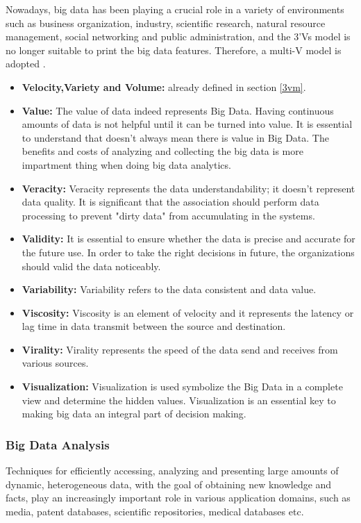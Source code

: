 Nowadays, big data has been playing a crucial role in a variety of environments such as business organization, industry, scientific research, natural resource management, social networking and public administration, and the 3'Vs model is no longer suitable to print the big data features. Therefore, a multi-V model is adopted \cite{cite18}.\\


\begin{itemize}
\item \textbf{Velocity,Variety and Volume:} already defined in section \ref{3vm}.  
\item \textbf{Value:} The value of data indeed represents Big Data. Having continuous amounts of data is not helpful until it can be turned into value. It is essential to understand that doesn't always mean there is value in Big Data. The benefits and costs of analyzing and collecting the big data is more impartment thing when doing big data analytics.
\item \textbf{Veracity:} Veracity represents the data understandability; it
doesn't represent data quality. It is significant that the association should perform data processing to prevent "dirty data" from accumulating in the systems. 
\item \textbf{Validity:} It
is essential to ensure whether the data is precise and accurate for the future use. In
order to take the right decisions in future, the organizations should valid the data
noticeably.
\item \textbf{Variability:} Variability refers to the data consistent and data value.
\item \textbf{Viscosity:} Viscosity is an element of velocity and it represents the latency or lag time in data transmit between the source and destination. 
\item \textbf{Virality:} Virality represents the speed of the data send and receives from various sources.
\item \textbf{Visualization:} Visualization is used symbolize the Big Data in a complete view and determine the hidden values. Visualization is an essential key to making big data an integral part of decision making.
\end{itemize}
\subsubsection{Big Data Analysis}
Techniques for efficiently accessing, analyzing and presenting large amounts of
dynamic, heterogeneous data, with the goal of obtaining new knowledge and facts, play
an increasingly important role in various application domains, such as media, patent
databases, scientific repositories, medical databases etc.\\

